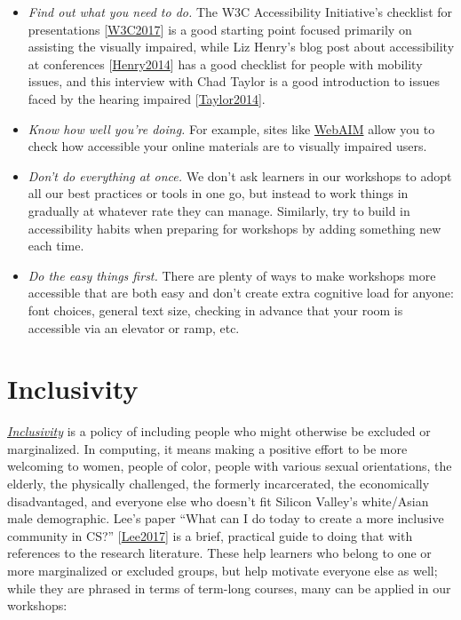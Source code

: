 \documentclass[10pt,statementpaper]{memoir}
\begin{document}
\begin{itemize}
\item
  \emph{Find out what you need to do.} The W3C Accessibility
  Initiative's checklist for presentations
  {[}\href{biblio.html\#w3c-accessibility}{W3C2017}{]} is a good
  starting point focused primarily on assisting the visually impaired,
  while Liz Henry's blog post about accessibility at conferences
  {[}\href{biblio.html\#henry-accessibility}{Henry2014}{]} has a good
  checklist for people with mobility issues, and this interview with
  Chad Taylor is a good introduction to issues faced by the hearing
  impaired {[}\href{biblio.html\#taylor-interview}{Taylor2014}{]}.
\item
  \emph{Know how well you're doing.} For example, sites like
  \href{http://webaim.org/}{WebAIM} allow you to check how accessible
  your online materials are to visually impaired users.
\item
  \emph{Don't do everything at once.} We don't ask learners in our
  workshops to adopt all our best practices or tools in one go, but
  instead to work things in gradually at whatever rate they can manage.
  Similarly, try to build in accessibility habits when preparing for
  workshops by adding something new each time.
\item
  \emph{Do the easy things first.} There are plenty of ways to make
  workshops more accessible that are both easy and don't create extra
  cognitive load for anyone: font choices, general text size, checking
  in advance that your room is accessible via an elevator or ramp, etc.
\end{itemize}

\section{Inclusivity}\label{inclusivity}

\emph{\href{gloss.html\#inclusivity}{Inclusivity}} is a policy of
including people who might otherwise be excluded or marginalized. In
computing, it means making a positive effort to be more welcoming to
women, people of color, people with various sexual orientations, the
elderly, the physically challenged, the formerly incarcerated, the
economically disadvantaged, and everyone else who doesn't fit Silicon
Valley's white/Asian male demographic. Lee's paper ``What can I do today
to create a more inclusive community in CS?''
{[}\href{biblio.html\#lee-create-inclusive-community}{Lee2017}{]} is a
brief, practical guide to doing that with references to the research
literature. These help learners who belong to one or more marginalized
or excluded groups, but help motivate everyone else as well; while they
are phrased in terms of term-long courses, many can be applied in our
workshops:
\end{document}
